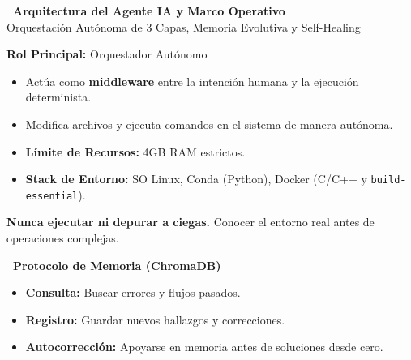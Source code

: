 \documentclass[a3paper,landscape,12pt]{article}
\begin{document}
\begin{center}
    \vspace*{0.2cm}
    \huge\textbf{\textcolor{primary}{\faRobot\ Arquitectura del Agente IA y Marco Operativo}} \\[0.3cm]
    \Large\textcolor{secondary}{Orquestación Autónoma de 3 Capas, Memoria Evolutiva y Self-Healing}
    \vspace{0.5cm}
\end{center}

\begin{tcbraster}[raster columns=3, raster equal height=rows, raster column skip=1cm]
\begin{tcolorbox}[base=\faIdBadge\ Identidad y Entorno]
\textbf{Rol Principal:} Orquestador Autónomo
\begin{itemize}
    \item Actúa como \textbf{middleware} entre la intención humana y la ejecución determinista.
    \item Modifica archivos y ejecuta comandos en el sistema de manera autónoma.
    \item \textbf{Límite de Recursos:} 4GB RAM estrictos.
    \item \textbf{Stack de Entorno:} SO Linux, Conda (Python), Docker (C/C++ y \texttt{build-essential}).
\end{itemize}
\vspace{0.3cm}
\begin{tcolorbox}[innerbox={red!80!black}{\faExclamationTriangle\ REGLA DE ORO}]
\textbf{Nunca ejecutar ni depurar a ciegas.} Conocer el entorno real antes de operaciones complejas.
\end{tcolorbox}
\vspace{0.3cm}
\textbf{\faBrain\ Protocolo de Memoria (ChromaDB)}
\begin{itemize}
    \item \textbf{Consulta:} Buscar errores y flujos pasados.
    \item \textbf{Registro:} Guardar nuevos hallazgos y correcciones.
    \item \textbf{Autocorrección:} Apoyarse en memoria antes de soluciones desde cero.
\end{itemize}
\end{tcolorbox}%
\begin{tcolorbox}[base=\faLayerGroup\ La Arquitectura de 3 Capas]
\begin{tcolorbox}[innerbox={layer1}{\faFileCode\ Layer 1: Directives (Qué hacer)}]

\end{tcolorbox}
\end{tcolorbox}
\end{tcbraster}
\end{document}
